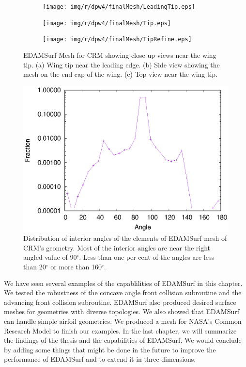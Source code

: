 \begin{figure}[!hbt]
	\centering
	\begin{subfigure}{\textwidth}
		\centering
		\texttt{[image: img/r/dpw4/finalMesh/LeadingTip.eps]}
		\caption{}
		\label{dLeadingTip}
	\end{subfigure}
	\begin{subfigure}{\textwidth}
		\centering
		\texttt{[image: img/r/dpw4/finalMesh/Tip.eps]}
		\caption{}
		\label{dTip}
	\end{subfigure}	
	\begin{subfigure}{\textwidth}
		\centering
		\texttt{[image: img/r/dpw4/finalMesh/TipRefine.eps]}
		\caption{}
		\label{dTipRefine}
	\end{subfigure}
	\caption[Close up views near wing tip of EDAMSurf mesh of CRM.]{EDAMSurf Mesh for CRM showing close up views near the wing tip. (a) Wing tip near the leading edge. (b) Side view showing the mesh on the end cap of the wing. (c) Top view near the wing tip.}
	\label{fig-dpw4Tip}
\end{figure}

\begin{figure}
	\centering
	\includegraphics[width=0.8\linewidth]{img/r/dpw4/quality.eps}
	\caption[Quality of EDAMSurf mesh for CRM showing distribution of interior angles.]{Distribution of interior angles of the elements of EDAMSurf mesh of CRM's geometry. Most of the interior angles are near the right angled value of 90$^\circ$. Less than one per cent of the angles are less than 20$^\circ$ or more than 160$^\circ$.}
	\label{fig-quality}
\end{figure}

We have seen several examples of the capablilities of EDAMSurf in this chapter. We tested the robustness of the concave angle front collision subroutine and the advancing front collision subroutine. EDAMSurf also produced desired surface meshes for geometries with diverse topologies. We also showed that EDAMSurf can handle simple airfoil geometries. We produced a mesh for NASA's Common Research Model to finish our examples. In the last chapter, we will summarize the findings of the thesis and the capabilities of EDAMSurf. We would conclude by adding some things that might be done in the future to improve the performance of EDAMSurf and to extend it in three dimensions.